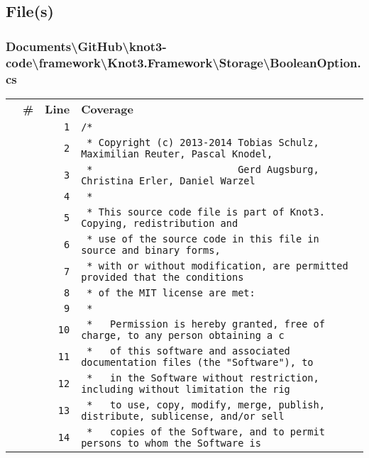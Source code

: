 \documentclass[a4paper,10pt]{article}
\begin{document}
\subsection{File(s)}
\subsubsection{Documents\textbackslash GitHub\textbackslash knot3-code\textbackslash framework\textbackslash Knot3.Framework\textbackslash Storage\textbackslash BooleanOption.cs}
\begin{longtable}[l]{lrrl}
\textbf{} & \textbf{\#} & \textbf{Line} & \textbf{Coverage}\\
\cellcolor{gray} &  & \verb~1~ & \verb~/*~\\
\cellcolor{gray} &  & \verb~2~ & \verb~ * Copyright (c) 2013-2014 Tobias Schulz, Maximilian Reuter, Pascal Knodel,~\\
\cellcolor{gray} &  & \verb~3~ & \verb~ *                         Gerd Augsburg, Christina Erler, Daniel Warzel~\\
\cellcolor{gray} &  & \verb~4~ & \verb~ *~\\
\cellcolor{gray} &  & \verb~5~ & \verb~ * This source code file is part of Knot3. Copying, redistribution and~\\
\cellcolor{gray} &  & \verb~6~ & \verb~ * use of the source code in this file in source and binary forms,~\\
\cellcolor{gray} &  & \verb~7~ & \verb~ * with or without modification, are permitted provided that the conditions~\\
\cellcolor{gray} &  & \verb~8~ & \verb~ * of the MIT license are met:~\\
\cellcolor{gray} &  & \verb~9~ & \verb~ *~\\
\cellcolor{gray} &  & \verb~10~ & \verb~ *   Permission is hereby granted, free of charge, to any person obtaining a c~\\
\cellcolor{gray} &  & \verb~11~ & \verb~ *   of this software and associated documentation files (the "Software"), to ~\\
\cellcolor{gray} &  & \verb~12~ & \verb~ *   in the Software without restriction, including without limitation the rig~\\
\cellcolor{gray} &  & \verb~13~ & \verb~ *   to use, copy, modify, merge, publish, distribute, sublicense, and/or sell~\\
\cellcolor{gray} &  & \verb~14~ & \verb~ *   copies of the Software, and to permit persons to whom the Software is~\\

\end{longtable}
\end{document}
